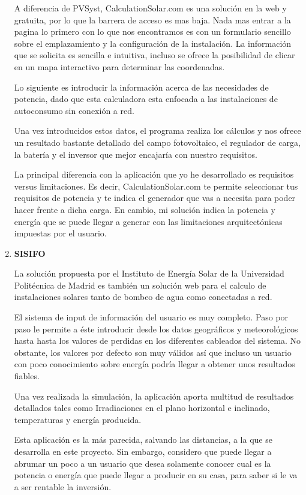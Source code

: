 \begin{enumerate}
A diferencia de PVSyst, CalculationSolar.com es una solución en la web y gratuita, por lo que la barrera de acceso es mas baja.
Nada mas entrar a la pagina lo primero con lo que nos encontramos es con un formulario sencillo sobre el emplazamiento y la configuración de la instalación. La información que se solicita es sencilla e intuitiva, incluso se ofrece la posibilidad de clicar en un mapa interactivo para determinar las coordenadas.

Lo siguiente es introducir la información acerca de las necesidades de potencia, dado que esta calculadora esta enfocada a las instalaciones de autoconsumo sin conexión a red.

Una vez introducidos estos datos, el programa realiza los cálculos y nos ofrece un resultado bastante detallado del campo fotovoltaico, el regulador de carga, la batería y el inversor que mejor encajaría con nuestro requisitos.

La principal diferencia con la aplicación que yo he desarrollado es requisitos versus limitaciones. Es decir, CalculationSolar.com te permite seleccionar tus requisitos de potencia y te indica el generador que vas a necesita para poder hacer frente a dicha carga. En cambio, mi solución indica la potencia y energía que se puede llegar a generar con las limitaciones arquitectónicas impuestas por el usuario. 

\item \textbf{SISIFO}

La solución propuesta por el Instituto de Energía Solar de la Universidad Politécnica de Madrid es también un solución web para el calculo de instalaciones solares tanto de bombeo de agua como conectadas a red.

El sistema de input de información del usuario es muy completo. Paso por paso le permite a éste introducir desde los datos geográficos y meteorológicos hasta hasta los valores de perdidas en los diferentes cableados del sistema. No obstante, los valores por defecto son muy válidos así que incluso un usuario con poco conocimiento sobre energía podría llegar a obtener unos resultados fiables.

Una vez realizada la simulación, la aplicación aporta multitud de resultados detallados tales como Irradiaciones en el plano horizontal e inclinado, temperaturas y energía producida.

Esta aplicación es la más parecida, salvando las distancias, a la que se desarrolla en este proyecto. Sin embargo, considero que puede llegar a abrumar un poco a un usuario que desea solamente conocer cual es la potencia o energía que puede llegar a producir en su casa, para saber si le va a ser rentable la inversión.
\end{enumerate}
